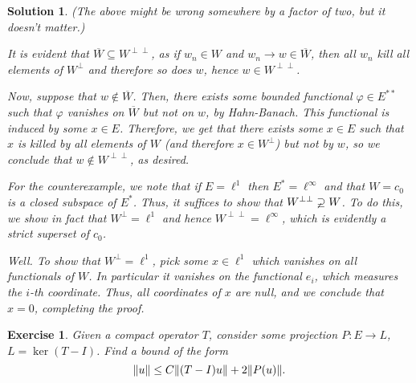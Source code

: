 \documentclass{article}
\newtheorem{ex}{Exercise}
\theoremstyle{nonumberplain}
\newtheorem{sol}{Solution}
\newcommand{\closed}[1]{\overline{#1}}
\DeclarePairedDelimiter{\Norm}{\lVert}{\rVert}
\begin{document}
\begin{sol}
(The above might be wrong somewhere by a factor of two, but it doesn't matter.)

\item It is evident that $\closed W \subseteq W^{\perp \perp}$, as if $w_n \in W$ and $w_n \to w \in \closed W$, then all $w_n$ kill all elements of $W^\perp$ and therefore so does $w$, hence $w \in W^{\perp \perp}$.

Now, suppose that $w \not \in \closed W$. Then, there exists some bounded functional $\varphi \in E^{**}$ such that $\varphi$ vanishes on $\closed W$ but not on $w$, by Hahn-Banach. This functional is induced by some $x \in E$. Therefore, we get that there exists some $x \in E$ such that $x$ is killed by all elements of $W$ (and therefore $x \in W^\perp$) but not by $w$, so we conclude that $w \not \in W^{\perp \perp}$, as desired.

\smallskip

For the counterexample, we note that if $E = \ell^1$ then $E^* = \ell^\infty$ and that $W = c_0$ is a closed subspace of $E^*$. Thus, it suffices to show that $W^{\perp \perp} \varsupsetneq W$. To do this, we show in fact that $W^\perp = \ell^1$ and hence $W^{\perp \perp} = \ell^\infty$, which is evidently a strict superset of $c_0$.

Well. To show that $W^\perp = \ell^1$, pick some $x \in \ell^1$ which vanishes on all functionals of $W$. In particular it vanishes on the functional $e_i$, which measures the $i$-th coordinate. Thus, all coordinates of $x$ are null, and we conclude that $x = 0$, completing the proof.
\end{sol}

\begin{ex}
Given a compact operator $T$, consider some projection $P \colon E \to L$, $L = \ker(T-I)$. Find a bound of the form
\begin{equation}
\Norm{u} \leq C \Norm{(T-I)u} + 2 \Norm{P(u)}.
\end{equation}
\end{ex}
\end{document}
